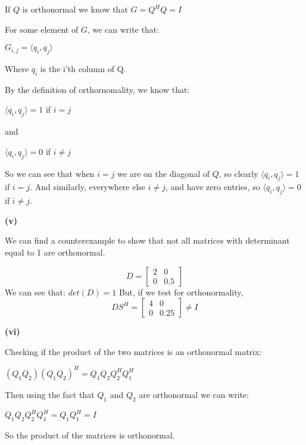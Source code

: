 \documentclass[letterpaper,12pt]{article}
\theoremstyle{definition}
\begin{document}
\begin{spacing}{1.3}{}
	\setlength{\leftskip}{20pt}
	
	If $Q$ is orthonormal we know that $G =Q^HQ = I$
	
	For some element of $G$, we can write that:
	
	$G_{i, j} = \langle q_{i}, q_{j} \rangle$
	
	Where $q_{i}$ is the i'th column of Q.
	
	By the definition of orthornomality, we know that:
	
	$\langle q_{i}, q_{j} \rangle = 1$ if $i=j$
	
	and
	
	$\langle q_{i}, q_{j} \rangle = 0$ if $i \neq j$
	
	So we can see that when $i=j$ we are on the diagonal of $Q$, so clearly $\langle q_{i}, q_{j} \rangle = 1$ if $i=j$. And similarly, everywhere else $i \neq j$, and have zero entries, so $\langle q_{i}, q_{j} \rangle = 0$ if $i \neq j$.
	
	\setlength{\leftskip}{10pt}
	
	\textbf{(v)}
	
	\setlength{\leftskip}{20pt}
	
	We can find a counterexample to show that not all matrices with determinant equal to 1 are orthonormal.
	
	\[D =
	\begin{bmatrix}
	2 & 0 \\
	0 & 0.5
	\end{bmatrix}
	\]
	We can see that:
	$det(D) = 1$
	But, if we test for orthonormality,
	\[DS^{H} =
	\begin{bmatrix}
	4 & 0 \\
	0 & 0.25
	\end{bmatrix} \neq I
	\]
	
	\setlength{\leftskip}{10pt}
	
	\textbf{(vi)}
	
	\setlength{\leftskip}{20pt}
	
	Checking if the product of the two matrices is an orthonormal matrix:
	
	$(Q_1Q_2)(Q_1Q_2)^H = Q_1Q_2Q_2^HQ_1^H$
	
	Then using the fact that $Q_1$ and $Q_2$ are orthonormal we can write:
	
	$Q_1Q_2Q_2^HQ_1^H = Q_1Q_1^H = I$
	
	So the product of the matrices is orthonormal. \\\\
	

\end{spacing}
\end{document}
